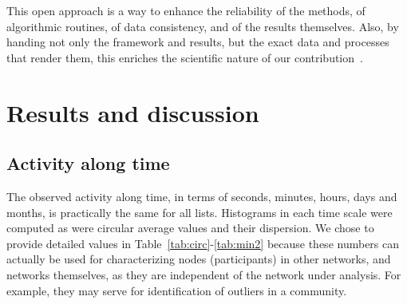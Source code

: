 \documentclass[%
	aip,
	jmp,%
	amsmath,amssymb,
	reprint,%
]{revtex4-1}
\begin{document}
This open approach is a way to enhance the reliability of the methods,
of algorithmic routines, of data consistency,
and of the results themselves.
Also,
by handing not only the framework and results,
but the exact data and processes that render them,
 this enriches the scientific nature of our contribution~\cite{openSci}.

\section{Results and discussion}\label{sec:results}
\subsection{Activity along time}\label{constDisc}
The observed activity along time, in terms of seconds, minutes, hours, days and months,  is practically the same for all lists.
Histograms in each time scale were computed as were circular average values and their dispersion.
We chose to provide detailed values in Table~\ref{tab:circ}-\ref{tab:min2} because these numbers can actually be used for characterizing nodes (participants) in other networks, and networks themselves, as they are independent of the network under analysis. For example, they may serve for identification of outliers in a community.
\end{document}
